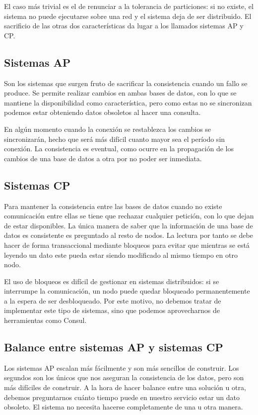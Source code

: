 \documentclass[11pt,a4paper]{article}
\begin{document}
El caso más trivial es el de renunciar a la tolerancia de particiones: si no existe, el sistema no puede ejecutarse sobre una red y el sistema deja de ser distribuido. El sacrificio de las otras dos características da lugar a los llamados sistemas AP y CP.

\subsection{Sistemas AP}

Son los sistemas que surgen fruto de sacrificar la consistencia cuando un fallo se produce. Se permite realizar cambios en ambas bases de datos, con lo que se mantiene la disponibilidad como característica, pero como estas no se sincronizan podemos estar obteniendo datos obsoletos al hacer una consulta.

En algún momento cuando la conexión se restablezca los cambios se sincronizarán, hecho que será más difícil cuanto mayor sea el período sin conexión. La consistencia es eventual, como ocurre en la propagación de los cambios de una base de datos a otra por no poder ser inmediata.

\subsection{Sistemas CP}

Para mantener la consistencia entre las bases de datos cuando no existe comunicación entre ellas se tiene que rechazar cualquier petición,  con lo que dejan de estar disponibles. La única manera de saber que la información de una base de datos es consistente es preguntado al resto de nodos. La lectura por tanto se debe hacer de forma transaccional mediante bloqueos para evitar que mientras se está leyendo un dato este pueda estar siendo modificado al mismo tiempo en otro nodo. 

El uso de bloqueos es difícil de gestionar en sistemas distribuidos: si se interrumpe la comunicación, un nodo puede quedar bloqueado permanentemente a la espera de ser desbloqueado. Por este motivo, no debemos tratar de implementar este tipo de sistemas, sino que podemos aprovecharnos de herramientas como Consul.

\subsection{Balance entre sistemas AP y sistemas CP}

Los sistemas AP escalan más fácilmente y son más sencillos de construir. Los segundos son los únicos que nos aseguran la consistencia de los datos, pero son más difíciles de construir. A la hora de hacer balance entre una solución u otra, debemos preguntarnos cuánto tiempo puede en nuestro servicio estar un dato obsoleto. El sistema no necesita hacerse completamente de una u otra manera.
\end{document}
